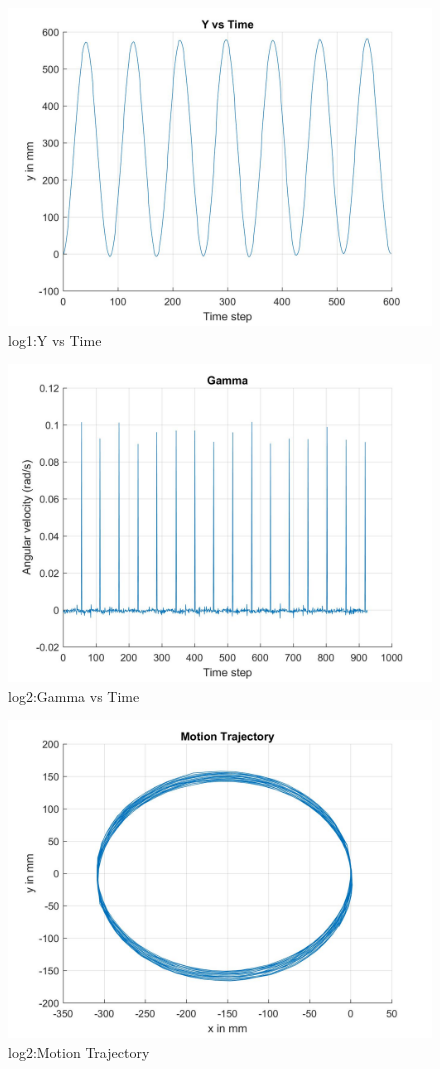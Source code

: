 \documentclass[paper=a4, fontsize=11pt]{scrartcl} %
\numberwithin{equation}{section} %
\numberwithin{figure}{section} %
\numberwithin{table}{section} %
\begin{document}
\begin{appendix}
\begin{figure}[H]
	\centering
	\includegraphics[width = 0.6\linewidth]{./figures/log1/yVsTime.jpg}
	\caption{log1:Y vs Time}
\end{figure}

\begin{figure}[H]
	\centering
	\includegraphics[width = 0.6\linewidth]{./figures/log2/gammaVsTime.jpg}
	\caption{log2:Gamma vs Time}
\end{figure}

\begin{figure}[H]
	\centering
	\includegraphics[width = 0.6\linewidth]{./figures/log2/motionTrajectory.jpg}
	\caption{log2:Motion Trajectory}
\end{figure}


\end{appendix}
\end{document}
